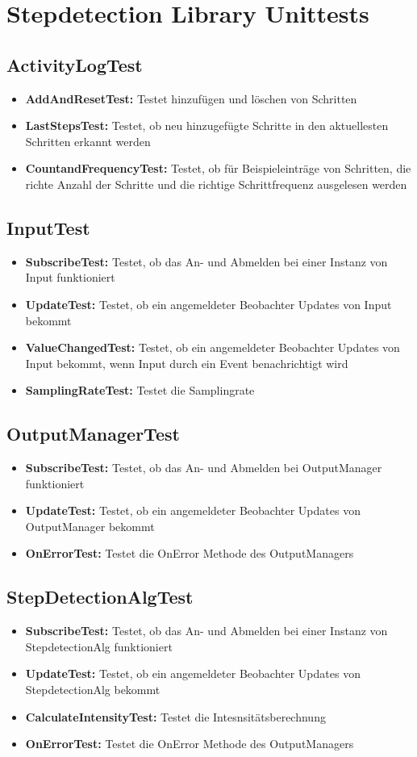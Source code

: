 \documentclass[../validierung.tex]{subfiles}
\begin{document}
\section{Stepdetection Library Unittests}
\subsection{ActivityLogTest}
\begin{itemize}
\item \textbf{AddAndResetTest:} Testet hinzufügen und löschen von Schritten
\item \textbf{LastStepsTest:} Testet, ob neu hinzugefügte Schritte in den aktuellesten Schritten erkannt werden
\item \textbf{CountandFrequencyTest:} Testet, ob für Beispieleinträge von Schritten, die richte Anzahl der Schritte und die richtige Schrittfrequenz ausgelesen werden
\end{itemize}
\subsection{InputTest}
\begin{itemize}
\item \textbf{SubscribeTest:} Testet, ob das An- und Abmelden bei einer Instanz von Input funktioniert
\item \textbf{UpdateTest:} Testet, ob ein angemeldeter Beobachter Updates von Input bekommt
\item \textbf{ValueChangedTest:} Testet, ob ein angemeldeter Beobachter Updates von Input bekommt, wenn Input durch ein Event benachrichtigt wird
\item \textbf{SamplingRateTest:} Testet die Samplingrate
\end{itemize}
\subsection{OutputManagerTest}
\begin{itemize}
\item \textbf{SubscribeTest:} Testet, ob das An- und Abmelden bei OutputManager funktioniert
\item \textbf{UpdateTest:} Testet, ob ein angemeldeter Beobachter Updates von OutputManager bekommt
\item \textbf{OnErrorTest:} Testet die OnError Methode des OutputManagers
\end{itemize}
\subsection{StepDetectionAlgTest}
\begin{itemize}
\item \textbf{SubscribeTest:} Testet, ob das An- und Abmelden bei einer Instanz von StepdetectionAlg funktioniert
\item \textbf{UpdateTest:} Testet, ob ein angemeldeter Beobachter Updates von StepdetectionAlg bekommt
\item \textbf{CalculateIntensityTest:} Testet die Intesnsitätsberechnung
\item \textbf{OnErrorTest:} Testet die OnError Methode des OutputManagers
\end{itemize}
\end{document}
